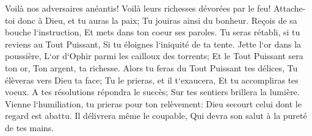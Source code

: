 \verse Voilà nos adversaires anéantis! Voilà leurs richesses dévorées par le feu! 
\verse Attache-toi donc à Dieu, et tu auras la paix; Tu jouiras ainsi du bonheur. 
\verse Reçois de sa bouche l`instruction, Et mets dans ton coeur ses paroles. 
\verse Tu seras rétabli, si tu reviens au Tout Puissant, Si tu éloignes l`iniquité de ta tente. 
\verse Jette l`or dans la poussière, L`or d`Ophir parmi les cailloux des torrents; 
\verse Et le Tout Puissant sera ton or, Ton argent, ta richesse. 
\verse Alors tu feras du Tout Puissant tes délices, Tu élèveras vers Dieu ta face; 
\verse Tu le prieras, et il t`exaucera, Et tu accompliras tes voeux. 
\verse A tes résolutions répondra le succès; Sur tes sentiers brillera la lumière. 
\verse Vienne l`humiliation, tu prieras pour ton relèvement: Dieu secourt celui dont le regard est abattu. 
\verse Il délivrera même le coupable, Qui devra son salut à la pureté de tes mains. 

